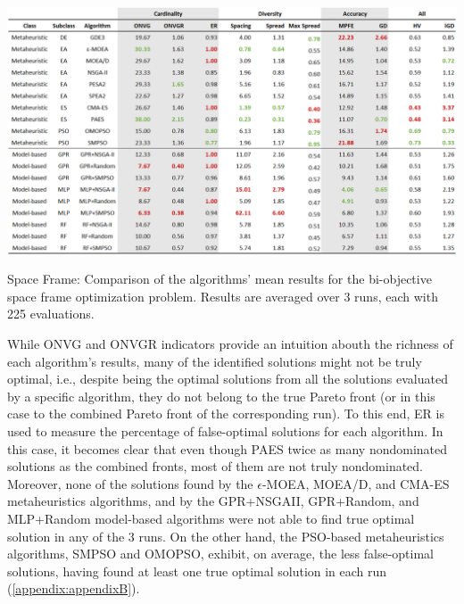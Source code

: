 \begin{table}[htbp]
	\centering
	\includegraphics[width=\textwidth]{Images/Evaluation/caadria/Results_Mean_20190413.PNG}
	\caption[Space Frame: Mean performance values of the algorithms' results]{Space Frame: Comparison of the algorithms' mean results for the bi-objective space frame optimization problem. Results are averaged over 3 runs, each with 225 evaluations.}
	\label{table:spaceframe}
\end{table}

While \ac{ONVG} and \ac{ONVGR} indicators provide an intuition abouth the richness of each algorithm's results, many of the identified solutions might not be truly optimal, i.e., despite being the optimal solutions from all the solutions evaluated by a specific algorithm, they do not belong to the true Pareto front (or in this case to the combined Pareto front of the corresponding run). To this end, \ac{ER} is used to measure the percentage of false-optimal solutions for each algorithm. In this case, it becomes clear that even though PAES twice as many nondominated solutions as the combined fronts, most of them are not truly nondominated. Moreover, none of the solutions found by the $\epsilon$-MOEA, MOEA/D, and CMA-ES metaheuristics algorithms, and by the GPR+NSGAII, GPR+Random, and MLP+Random model-based algorithms were not able to find true optimal solution in any of the 3 runs. On the other hand, the \ac{PSO}-based metaheuristics algorithms, SMPSO and OMOPSO, exhibit, on average, the less false-optimal solutions, having found at least one true optimal solution in each run (\cref{appendix:appendixB}).

